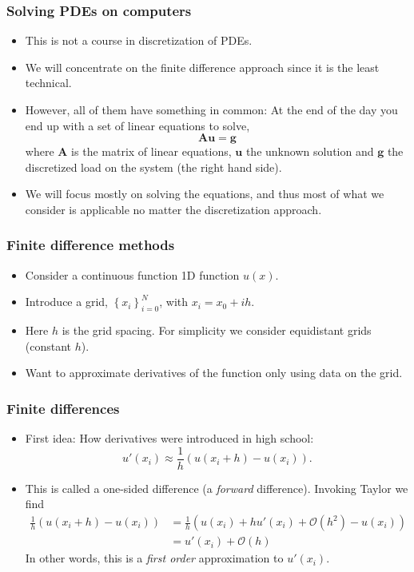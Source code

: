 \begin{frame}[fragile]
  \frametitle{Solving PDEs on computers}
  \begin{itemize}
  \item This is not a course in discretization of PDEs.
  \item We will concentrate on the finite difference approach since it is the
    least technical.
  \item However, all of them have something in common: At the end of the day you
    end up with a set of linear equations to solve,
    \[
      \bm A \bm u = \bm g
    \]
    where $\bm A$ is the matrix of linear equations, $\bm u$ the unknown
    solution and $\bm g$ the discretized load on the system (the right hand
    side).
  \item We will focus mostly on solving the equations, and thus most of what we
    consider is applicable no matter the discretization approach.
  \end{itemize}
\end{frame}

\begin{frame}
  \frametitle{Finite difference methods}
  \begin{itemize}
    \item Consider a continuous function 1D function $u(x)$.
    \item Introduce a grid, $\left\{x_i\right\}_{i=0}^N$, with $x_i = x_0+ih$.
    \item Here $h$ is the grid spacing. For simplicity we consider equidistant
      grids (constant $h$).
      \begin{center}
        \scalebox{0.7}{}
      \end{center}
    \item Want to approximate derivatives of the function only using data on the grid.
  \end{itemize}
\end{frame}

\begin{frame}
  \frametitle{Finite differences}
  \begin{itemize}
  \item First idea: How derivatives were introduced in high school:
    \[
      u'(x_i) \approx \frac{1}{h} \left( u(x_i+h)-u(x_i) \right).
    \]
  \item This is called a one-sided difference (a \emph{forward} difference).
    Invoking Taylor we find
    \begin{align*}
      \frac{1}{h} \left( u(x_i+h)-u(x_i) \right)
      &= \frac{1}{h} \left( u(x_i) + hu'(x_i) + \mathcal{O}(h^2) - u(x_i) \right) \\
      &= u'(x_i) + \mathcal{O}(h)
    \end{align*}
    In other words, this is a \emph{first order} approximation to $u'(x_i)$.
  \end{itemize}
\end{frame}

